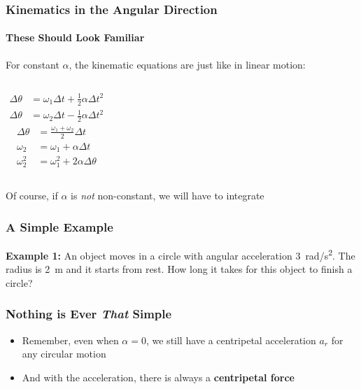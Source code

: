 \documentclass[12pt,compress,aspectratio=169]{beamer}
\begin{document}
\begin{frame}
  \frametitle{Kinematics in the Angular Direction}
  \framesubtitle{These Should Look Familiar}
  For constant $\alpha$, the kinematic equations are just like in linear
  motion:
  
  \begin{columns}
    {\LARGE
      \begin{align*}
        \Delta\theta&=\omega_1\Delta t + \frac{1}{2}\alpha\Delta t^2\\
        \Delta\theta&=\omega_2\Delta t - \frac{1}{2}\alpha\Delta t^2
      \end{align*}
    }
    {\LARGE
      \begin{align*}
        \Delta\theta&=\frac{\omega_1+\omega_2}{2} \Delta t\\
        \omega_2&= \omega_1+ \alpha\Delta t\\
        \omega_2^2& = \omega_1^2+ 2\alpha\Delta\theta
      \end{align*}
    }
  \end{columns}
  Of course, if $\alpha$ is \emph{not} non-constant, we will have to integrate
\end{frame}


\begin{frame}
  \frametitle{A Simple Example}
  \textbf{Example 1:} An object moves in a circle with angular acceleration
  \SI{3}{rad/\s^2}. The radius is \SI{2}{\metre} and it starts from rest. How
  long it takes for this object to finish a circle?
\end{frame}


\begin{frame}
  \frametitle{Nothing is Ever \emph{That} Simple}
  \begin{itemize}
  \item Remember, even when $\alpha=0$, we still have a centripetal
    acceleration $a_r$ for any circular motion


  \item And with the acceleration, there is always a \textbf{centripetal force}

  \end{itemize}
\end{frame}
\end{document}

